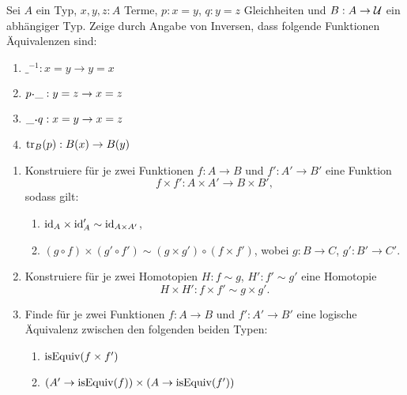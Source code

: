 \documentclass{uebung}
\begin{document}

\begin{exercise}
  Sei $A$ ein Typ, $x,y,z:A$ Terme, $p:x=y$, $q:y=z$ Gleichheiten und $B:A\to\mathcal{U}$ ein abhängiger Typ.
  Zeige durch Angabe von Inversen, dass folgende Funktionen Äquivalenzen sind:
  \begin{enumerate}
    \item $\_^{-1}:x=y\to y=x$
    \item $p\kon\_:y=z\to x=z$
    \item $\_\kon q:x=y\to x=z$
    \item $\mathrm{tr}_B(p):B(x)\to B(y)$
  \end{enumerate}
\end{exercise}

\begin{exercise}
  \begin{enumerate}
    \item Konstruiere für je zwei Funktionen $f:A\to B$ und $f':A'\to B'$ eine Funktion
      $$
      f\times f':A\times A'\to B\times B',
      $$
      sodass gilt:
      \begin{enumerate}
        \item $\mathrm{id}_A\times\mathrm{id}_A'\sim\mathrm{id}_{A\times A'}$,
        \item $(g\circ f)\times (g'\circ f')\sim(g\times g')\circ (f\times f')$, wobei $g:B\to C$, $g':B'\to C'$.
      \end{enumerate}
    \item Konstruiere für je zwei Homotopien $H:f\sim g$, $H':f'\sim g'$ eine Homotopie
      $$
      H\times H':f\times f'\sim g\times g'.
      $$
    \item Finde für je zwei Funktionen $f:A\to B$ und $f':A'\to B'$ eine logische Äquivalenz zwischen den folgenden beiden Typen:
      \begin{enumerate}
        \item $\mathrm{isEquiv}(f\times f')$
        \item $(A'\to \mathrm{isEquiv}(f))\times (A\to\mathrm{isEquiv}(f'))$
      \end{enumerate}
  \end{enumerate}
\end{exercise}
\end{document}

